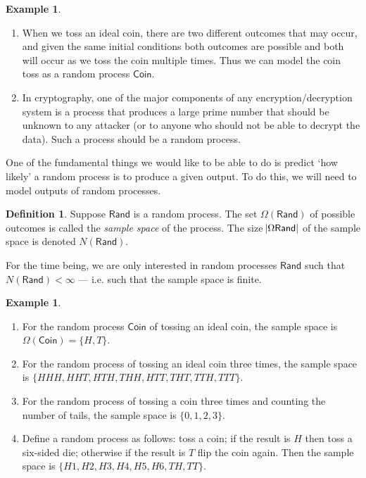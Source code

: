 \documentclass[a4paper,10pt]{article}
\newcommand{\rand}{\mathsf{Rand}}
\theoremstyle{definition}
\newtheorem{defn}[thm]{Definition}
\newtheorem{ex}[thm]{Example}
\begin{document}
\begin{ex}\leavevmode
  \begin{enumerate}
    \item When we toss an ideal coin, there are two different outcomes that may occur, and given the
          same initial conditions both outcomes are possible and both will occur as we toss the coin
          multiple times. Thus we can model the coin toss as a random process $ \mathsf{Coin} $.
    \item In cryptography, one of the major components of any encryption/decryption system is a process
          that produces a large prime number that should be unknown to any attacker (or to anyone
          who should not be able to decrypt the data). Such a process should be a random process.
  \end{enumerate}
\end{ex}

One of the fundamental things we would like to be able to do is predict `how likely' a
random process is to produce a given output. To do this, we will need to model outputs
of random processes.

\begin{defn}
  Suppose $ \rand $ is a random process. The set $ \Omega(\rand) $ of possible outcomes
  is called the \emph{sample space} of the process. The size $ \abs{\Omega{\rand}} $ of
  the sample space is denoted $ N(\rand) $.
\end{defn}

For the time being, we are only interested in random processes $ \rand $ such that $ N(\rand) < \infty $ --- i.e.
such that the sample space is finite.

\begin{ex}\leavevmode
  \begin{enumerate}
    \item For the random process $ \mathsf{Coin} $ of tossing an ideal coin, the sample space
          is $ \Omega(\mathsf{Coin}) = \{H, T\} $.
    \item For the random process of tossing an ideal coin three times, the sample space
          is $ \{HHH, HHT, HTH, THH, HTT, THT, TTH, TTT\} $.
    \item For the random process of tossing a coin three times and counting the number
          of tails, the sample space is $ \{0, 1, 2, 3\} $.
    \item Define a random process as follows: toss a coin; if the result is $ H $ then toss a six-sided die; otherwise
          if the result is $ T $ flip the coin again. Then the sample space is $ \{ H1, H2, H3, H4, H5, H6, TH, TT\} $.
  \end{enumerate}
\end{ex}
\end{document}
